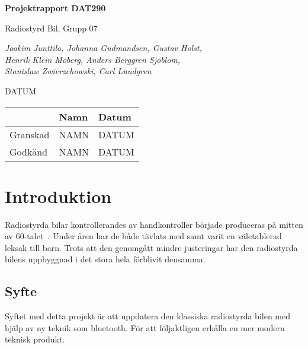 \documentclass[a4paper]{article}
\begin{document}
\begin{titlepage}
\centering
{\bfseries\huge Projektrapport DAT290}

\vspace{10mm}

{\Large Radiostyrd Bil, Grupp 07}

\vspace{20mm}

{\Large \itshape{Joakim Junttila, Johanna Gudmandsen, Gustav Holst,\\Henrik Klein Moberg, Anders Berggren Sjöblom, \\[1mm] Stanislaw Zwierzchowski, Carl Lundgren}}

\vspace{10mm}

{DATUM}


\normalsize{
\begin{table}[b]
\centering
\begin{tabular}{|l|l|l|}  \hline
          & \bf Namn & \bf Datum   \\ \hline \hline
 Granskad & NAMN     & DATUM        \\ \hline
 Godkänd  & NAMN     & DATUM         \\ \hline
  \end{tabular}  
  \end{table}}
\end{titlepage}

\tableofcontents


\newpage
\section{Introduktion}

Radiostyrda bilar kontrollerandes av handkontroller började produceras på mitten av 60-talet~\cite{RCHistory}. Under åren har de både tävlats med samt varit en väletablerad leksak till barn. Trots att den genomgått mindre justeringar har den radiostyrda bilens uppbyggnad i det stora hela förblivit densamma.

\subsection{Syfte}

Syftet med detta projekt är att uppdatera den klassiska radiostyrda bilen med hjälp av ny teknik som bluetooth. För att följaktligen erhålla en mer modern teknisk produkt.   %
\end{document}
